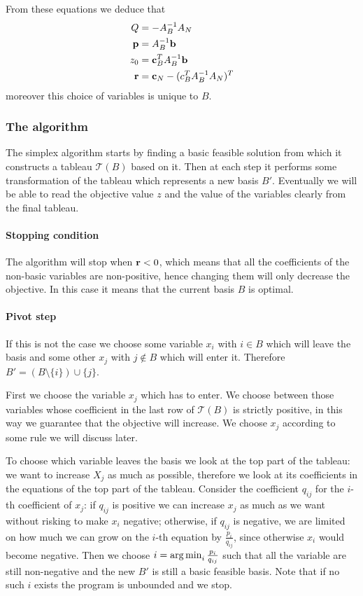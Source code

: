 \documentclass[12pt]{extarticle}
\renewcommand{\vec}[1]{\bvec{#1}}
\begin{document}
From these equations we deduce that
\begin{align}
	Q      & = -A_B^{-1} A_N                     \\
	\vec p & = A_B^{-1} \vec b                   \\
	z_0    & = \vec c_B^T A_B^{-1} \vec b        \\
	\vec r & = \vec c_N - (c^T_B A^{-1}_B A_N)^T
\end{align}
moreover this choice of variables is unique to $B$.

\subsubsection{The algorithm}

The simplex algorithm starts by finding a basic feasible solution from which it constructs a tableau
$\mathcal T(B)$ based on it.
Then at each step it performs some transformation of the tableau which represents a new basis $B'$.
Eventually we will be able to read the objective value $z$ and the value of the variables clearly
from the final tableau.

\paragraph{Stopping condition}
The algorithm will stop when $\vec r < 0$, which means that all the coefficients of the non-basic
variables are non-positive, hence changing them will only decrease the objective.
In this case it means that the current basis $B$ is optimal.

\paragraph{Pivot step}
If this is not the case we choose some variable $x_i$ with $i \in B$ which will leave the basis and
some other $x_j$ with $j \notin B$ which will enter it.
Therefore $B'= (B \setminus \{i\}) \cup \{j\}$.

First we choose the variable $x_j$ which has to enter. We choose between those variables whose
coefficient in the last row of $\mathcal T(B)$ is strictly positive, in this way we guarantee that
the objective will increase.
We choose $x_j$ according to some rule we will discuss later.

To choose which variable leaves the basis we look at the top part of the tableau: we want to increase
$X_j$ as much as possible, therefore we look at its coefficients in the equations of the top part of
the tableau.
Consider the coefficient $q_{ij}$ for the $i$-th coefficient of $x_j$: if $q_{ij}$ is positive we
can increase $x_j$ as much as we want without risking to make $x_i$ negative; otherwise, if $q_{ij}$
is negative, we are limited on how much we can grow on the $i$-th equation by $\frac{p_i}{q_{ij}}$,
since otherwise $x_i$ would become negative.
Then we choose $i = \operatorname*{arg\,min}_{i} \frac{p_i}{q_{ij}}$ such that all the variable are still
non-negative and the new $B'$ is still a basic feasible basis.
Note that if no such $i$ exists the program is unbounded and we stop.
\end{document}
